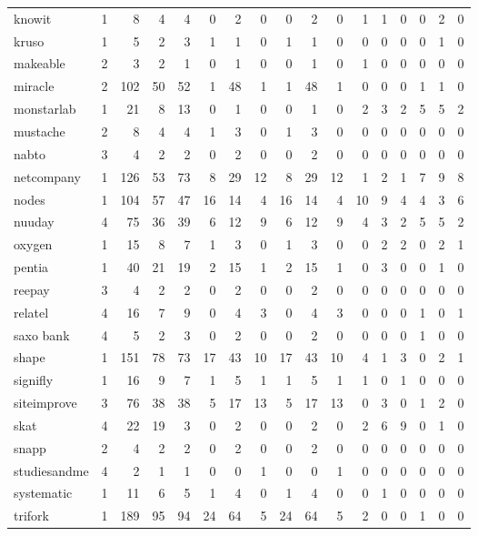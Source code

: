 \begin{tabular}{lrrrrrrrrrrrrrrrr}
knowit & 1 & 8 & 4 & 4 & 0 & 2 & 0 & 0 & 2 & 0 & 1 & 1 & 0 & 0 & 2 & 0 \\
kruso & 1 & 5 & 2 & 3 & 1 & 1 & 0 & 1 & 1 & 0 & 0 & 0 & 0 & 0 & 1 & 0 \\
makeable & 2 & 3 & 2 & 1 & 0 & 1 & 0 & 0 & 1 & 0 & 1 & 0 & 0 & 0 & 0 & 0 \\
miracle & 2 & 102 & 50 & 52 & 1 & 48 & 1 & 1 & 48 & 1 & 0 & 0 & 0 & 1 & 1 & 0 \\
monstarlab & 1 & 21 & 8 & 13 & 0 & 1 & 0 & 0 & 1 & 0 & 2 & 3 & 2 & 5 & 5 & 2 \\
mustache & 2 & 8 & 4 & 4 & 1 & 3 & 0 & 1 & 3 & 0 & 0 & 0 & 0 & 0 & 0 & 0 \\
nabto & 3 & 4 & 2 & 2 & 0 & 2 & 0 & 0 & 2 & 0 & 0 & 0 & 0 & 0 & 0 & 0 \\
netcompany & 1 & 126 & 53 & 73 & 8 & 29 & 12 & 8 & 29 & 12 & 1 & 2 & 1 & 7 & 9 & 8 \\
nodes & 1 & 104 & 57 & 47 & 16 & 14 & 4 & 16 & 14 & 4 & 10 & 9 & 4 & 4 & 3 & 6 \\
nuuday & 4 & 75 & 36 & 39 & 6 & 12 & 9 & 6 & 12 & 9 & 4 & 3 & 2 & 5 & 5 & 2 \\
oxygen & 1 & 15 & 8 & 7 & 1 & 3 & 0 & 1 & 3 & 0 & 0 & 2 & 2 & 0 & 2 & 1 \\
pentia & 1 & 40 & 21 & 19 & 2 & 15 & 1 & 2 & 15 & 1 & 0 & 3 & 0 & 0 & 1 & 0 \\
reepay & 3 & 4 & 2 & 2 & 0 & 2 & 0 & 0 & 2 & 0 & 0 & 0 & 0 & 0 & 0 & 0 \\
relatel & 4 & 16 & 7 & 9 & 0 & 4 & 3 & 0 & 4 & 3 & 0 & 0 & 0 & 1 & 0 & 1 \\
saxo bank & 4 & 5 & 2 & 3 & 0 & 2 & 0 & 0 & 2 & 0 & 0 & 0 & 0 & 1 & 0 & 0 \\
shape & 1 & 151 & 78 & 73 & 17 & 43 & 10 & 17 & 43 & 10 & 4 & 1 & 3 & 0 & 2 & 1 \\
signifly & 1 & 16 & 9 & 7 & 1 & 5 & 1 & 1 & 5 & 1 & 1 & 0 & 1 & 0 & 0 & 0 \\
siteimprove & 3 & 76 & 38 & 38 & 5 & 17 & 13 & 5 & 17 & 13 & 0 & 3 & 0 & 1 & 2 & 0 \\
skat & 4 & 22 & 19 & 3 & 0 & 2 & 0 & 0 & 2 & 0 & 2 & 6 & 9 & 0 & 1 & 0 \\
snapp & 2 & 4 & 2 & 2 & 0 & 2 & 0 & 0 & 2 & 0 & 0 & 0 & 0 & 0 & 0 & 0 \\
studiesandme & 4 & 2 & 1 & 1 & 0 & 0 & 1 & 0 & 0 & 1 & 0 & 0 & 0 & 0 & 0 & 0 \\
systematic & 1 & 11 & 6 & 5 & 1 & 4 & 0 & 1 & 4 & 0 & 0 & 1 & 0 & 0 & 0 & 0 \\
trifork & 1 & 189 & 95 & 94 & 24 & 64 & 5 & 24 & 64 & 5 & 2 & 0 & 0 & 1 & 0 & 0 \\

\end{tabular}
